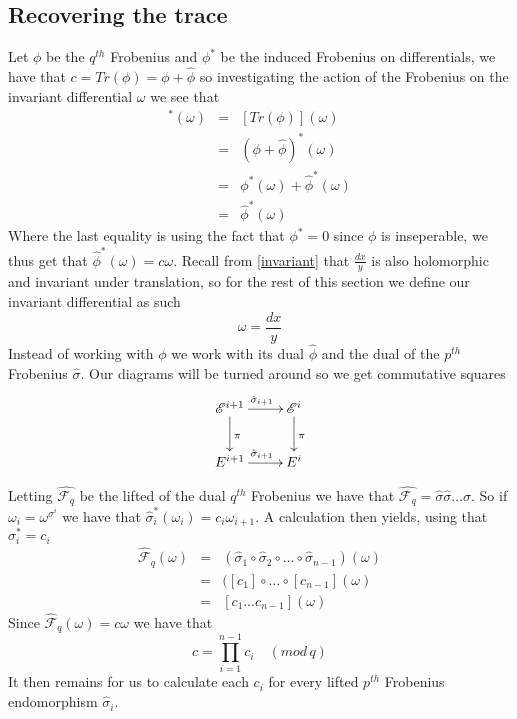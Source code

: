 \subsection{Recovering the trace}
Let $\phi$ be the $q^{th}$ Frobenius and $\phi^*$ be the induced Frobenius on differentials, 
we have that $c = Tr(\phi) = \phi + \hat{\phi}$ so investigating the
action of the Frobenius on the invariant differential $\omega$ we see that
\begin{eqnarray}
 [Tr(\phi)]^*(\omega)&=& [Tr(\phi)](\omega) \nonumber \\
		     &=& (\phi + \hat{\phi})^*(\omega) \nonumber \\
		     &=& \phi^*(\omega) + \hat{\phi}^*(\omega) \nonumber \\
		     &=& \hat{\phi}^*(\omega) \nonumber
\end{eqnarray}
Where the last equality is using the fact that $\phi^* = 0$ since $\phi$ is inseperable, we thus
get that $\hat{\phi}^*(\omega) = c\omega$.
Recall from \ref{invariant} that $\frac{dx}{y}$ is also holomorphic and invariant under translation,
so for the rest of this section we define our invariant differential as such
$$ \omega = \frac{dx}{y} $$
Instead of working with $\phi$ we work with its dual $\hat{\phi}$ and the dual
of the $p^{th}$ Frobenius $\hat{\sigma}$. Our diagrams will be turned around so we get commutative
squares
$$
\xymatrix {
  \mathscr{E}^{i+1} \ar[r]^{\hat{\sigma}_{i+1}} \ar[d]^\pi & \mathscr{E}^i \ar[d]^\pi \\
  E^{i+1} \ar[r]^{\hat{\sigma}_{i+1}} & E^i 
}
$$

Letting $\hat{\mathscr{F}_q}$ be the lifted of the dual $q^{th}$ Frobenius we have that
$\hat{\mathscr{F}_q} = \hat{\sigma} \hat{\sigma} \ldots \hat{\sigma}$.
So if $\omega_i = \omega^{\sigma^i}$ we have that $\hat{\sigma}_i^*(\omega_i) = c_i \omega_{i+1}$.
A calculation then yields, using that $\sigma_i^* = c_i$
\begin{eqnarray}
  \hat{\mathscr{F}}_q(\omega) &=& (\hat{\sigma}_1 \circ \hat{\sigma}_2 \circ \ldots \circ \hat{\sigma}_{n-1})(\omega) \nonumber \\
			      &=& ([c_1] \circ \ldots \circ [c_{n-1}](\omega) \nonumber \\
			      &=& [c_1\ldots c_{n-1}](\omega) \nonumber
\end{eqnarray}
Since $\hat{\mathscr{F}}_q(\omega) = c \omega$ we have that
$$ c = \prod_{i=1}^{n-1} c_i \quad (mod\, q) $$
It then remains for us to calculate each $c_i$ for every lifted $p^{th}$ Frobenius
endomorphism $\hat{\sigma}_i$.

